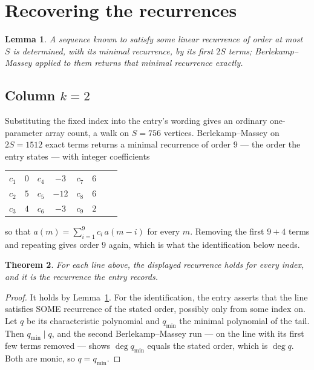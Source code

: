 \documentclass[11pt,a4paper]{article}
\theoremstyle{plain}
\newtheorem{theorem}{Theorem}
\newtheorem{lemma}[theorem]{Lemma}
\theoremstyle{definition}
\begin{document}
\section{Recovering the recurrences}

\begin{lemma}\label{lem:bm}
A sequence known to satisfy some linear recurrence of order at most $S$ is determined, with its
minimal recurrence, by its first $2S$ terms; Berlekamp--Massey applied to them returns that
minimal recurrence exactly.
\end{lemma}

\subsection*{Column $k=2$}
Substituting the fixed index into the entry's wording gives an ordinary one-parameter array
count, a walk on $S=756$ vertices. Berlekamp--Massey on $2S=1512$ exact terms
returns a minimal recurrence of order $9$ --- the order the entry states --- with
integer coefficients
\begin{center}\small\begin{tabular}{cccccccc}
$c_{1}$ & $0$ & $c_{4}$ & $-3$ & $c_{7}$ & $6$ &  &  \\
$c_{2}$ & $5$ & $c_{5}$ & $-12$ & $c_{8}$ & $6$ &  &  \\
$c_{3}$ & $4$ & $c_{6}$ & $-3$ & $c_{9}$ & $2$ &  &  \\
\end{tabular}\end{center}
so that $a(m)=\sum_{i=1}^{9}c_i\,a(m-i)$ for every $m$. Removing the first
$9+4$ terms and repeating gives order $9$ again, which is what the
identification below needs.

\begin{theorem}
For each line above, the displayed recurrence holds for every index, and it is the recurrence
the entry records.
\end{theorem}

\begin{proof}
It holds by Lemma~\ref{lem:bm}. For the identification, the entry asserts that the line
satisfies SOME recurrence of the stated order, possibly only from some index on. Let $q$ be its
characteristic polynomial and $q_{\min}$ the minimal polynomial of the tail. Then
$q_{\min}\mid q$, and the second Berlekamp--Massey run --- on the line with its first few
terms removed --- shows $\deg q_{\min}$ equals the stated order, which is $\deg q$. Both are
monic, so $q=q_{\min}$.
\end{proof}
\end{document}
